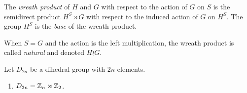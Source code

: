 \begin{defn}
    The \textsl{wreath product} of\/ $H$ and\/ $G$ with respect to the action of\/ $G$ on\/ $S$ is the semidirect product\/ $H^S\rtimes G$ with respect to the induced action of\/ $G$ on\/ $H^S$. The group $H^S$ is the \textsl{base} of the wreath product.

    When\/ $S=G$ and the action is the left multiplication, the wreath product is called \textsl{natural} and denoted\/ $H\wr G$.
\end{defn}

\begin{xmpl}
    Let $D_{2n}$ be a dihedral group with $2n$ elements.
    \begin{enumerate}[\rm a)]
        \item $D_{2n}=\mathbb{Z}_n\rtimes\mathbb{Z}_2$. 
        

\end{enumerate}
\end{xmpl}
